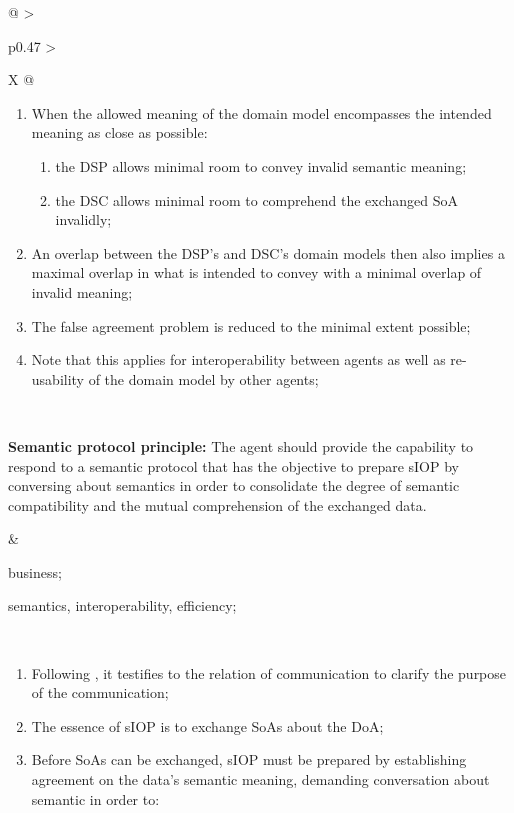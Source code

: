 \begin{xltabular}[l]{\linewidth}{@{} >{\small\raggedright\arraybackslash}p{0.47\linewidth} >{\small\raggedright\arraybackslash}X @{}}
\begin{enumerate}[left=10pt, nosep]
  \item When the allowed meaning of the domain model encompasses the intended meaning as close as possible:
  \begin{enumerate}
    \item the DSP allows minimal room to convey invalid semantic meaning;
    \item the DSC allows minimal room to comprehend the exchanged SoA invalidly;
  \end{enumerate}
  \item An overlap between the DSP's and DSC's domain models then also implies a maximal overlap in what is intended to convey with a minimal overlap of invalid meaning; 
  \item The false agreement problem is reduced to the minimal extent possible;
  \item Note that this applies for interoperability between agents as well as re-usability of the domain model by other agents;
\end{enumerate} \\
%
%
%
\begin{mmdp}\label{dp:spp}{\bfseries Semantic protocol principle:}
\quad The agent should provide the capability to respond to a semantic protocol that has the objective to prepare sIOP by conversing about semantics in order to consolidate the degree of semantic compatibility and the mutual comprehension of the exchanged data.
\end{mmdp}
&
\begin{description}[labelwidth=3.7cm,leftmargin=3.7cm+1ex,nosep,topsep=2ex,labelsep=1ex,font=\bfseries]
  \item[Type of information:] business;
  \item[Quality attributes:] semantics, interoperability, efficiency;
\end{description} \\
\begin{enumerate}[left=6pt, nosep]
  \item Following \cite{Grice:1991BT}, it testifies to the relation of communication to clarify the purpose of the communication;
  \item The essence of sIOP is to exchange SoAs about the DoA;
  \item Before SoAs can be exchanged, sIOP must be prepared by establishing agreement on the data's semantic meaning, demanding conversation about semantic in order to:
  \begin{enumerate}

\end{enumerate}
\end{enumerate}
\end{xltabular}

